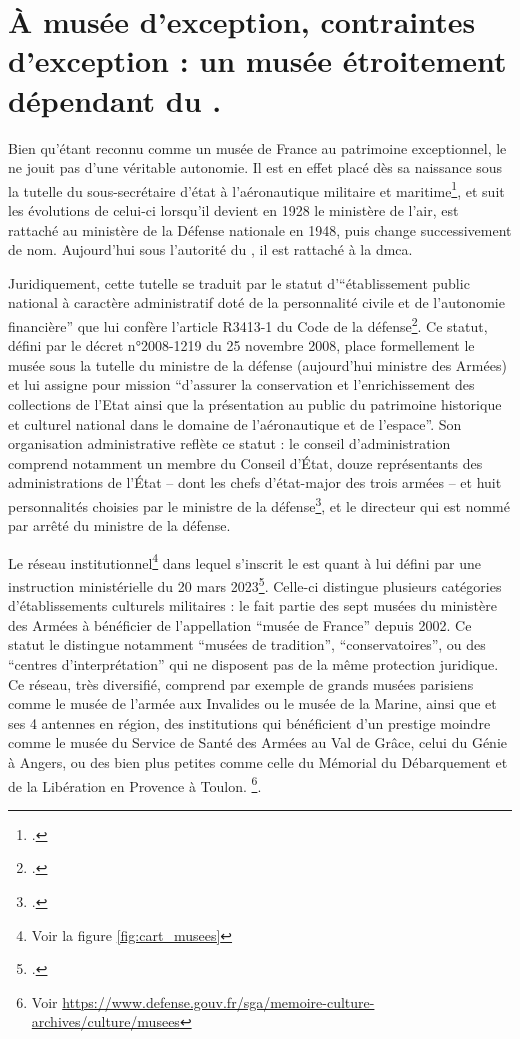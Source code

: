 \section{\label{I-B-1}À musée d'exception, contraintes d'exception : un musée étroitement dépendant du \minarm. }

Bien qu'étant reconnu comme un musée de France au patrimoine exceptionnel, le \mae ne jouit pas d'une véritable autonomie. Il est en effet placé dès sa naissance sous la tutelle du sous-secrétaire d'état à l'aéronautique militaire et maritime\footcite{terrierAeroportParisBourget2019}, et suit les évolutions de celui-ci lorsqu'il devient en 1928 le ministère de l'air, est rattaché au ministère de la Défense nationale en 1948, puis change successivement de nom. Aujourd'hui sous l'autorité du \minarm, il est rattaché à la \gls{dmca}.

Juridiquement, cette tutelle se traduit par le statut d'\enquote{établissement public national à caractère administratif doté de la personnalité civile et de l'autonomie financière} que lui confère l'article R3413-1 du Code de la défense\footcite{ArticleR34131Code2008}. Ce statut, défini par le décret n°2008-1219 du 25 novembre 2008, place formellement le musée sous la tutelle du ministre de la défense (aujourd'hui ministre des Armées) et lui assigne pour mission  \enquote{d'assurer la conservation et l'enrichissement des collections de l'Etat ainsi que la présentation au public du patrimoine historique et culturel national dans le domaine de l'aéronautique et de l'espace}. Son organisation administrative reflète ce statut : le conseil d'administration comprend notamment un membre du Conseil d'État, douze représentants des administrations de l'État -- dont les chefs d'état-major des trois armées -- et huit personnalités choisies par le ministre de la défense\footcite{ArticleR341373Code2013}, et le directeur qui est nommé par arrêté du ministre de la défense.

Le réseau institutionnel\footnote{Voir la figure \ref{fig:cart_musees}} dans lequel s'inscrit le \mae est quant à lui défini  par une instruction ministérielle du 20 mars 2023\footcite{ministeredesarmeesInstructionNdeg303ARM2023}. 
Celle-ci distingue plusieurs catégories d'établissements culturels militaires : le \mae fait partie des sept musées du ministère des Armées à bénéficier de l'appellation \enquote{musée de France} depuis 2002. Ce statut le distingue notamment \enquote{musées de tradition}, \enquote{conservatoires}, ou des \enquote{centres d'interprétation} qui ne disposent pas de la même protection juridique. Ce réseau, très diversifié, comprend par exemple de grands musées parisiens comme le musée de l'armée aux Invalides ou le musée de la Marine, ainsi que et ses 4 antennes en région, des institutions qui bénéficient d'un prestige moindre comme le musée du Service de Santé des Armées au Val de Grâce, celui du Génie à Angers, ou des bien plus petites comme celle du Mémorial du Débarquement et de la Libération en Provence à Toulon.
\footnote{Voir \url{https://www.defense.gouv.fr/sga/memoire-culture-archives/culture/musees}}.


